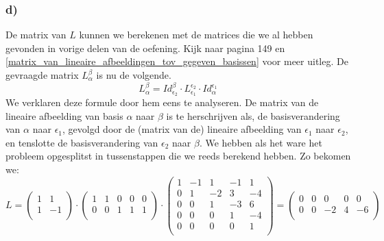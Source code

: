 \documentclass[lineaire_algebra_oplossingen.tex]{subfiles}
\begin{document}
\subsubsection*{d)}
De matrix van $L$ kunnen we berekenen met de matrices die we al hebben gevonden in vorige delen van de oefening. Kijk naar pagina 149 en \ref{matrix_van_lineaire_afbeeldingen_tov_gegeven_basissen} voor meer uitleg.
De gevraagde matrix $L_\alpha^\beta$ is nu de volgende.
\[
L_\alpha^\beta = Id_{\epsilon_2}^\beta\cdot L_{\epsilon_1}^{\epsilon_2}\cdot Id_{\alpha}^{\epsilon_1}
\]
We verklaren deze formule door hem eens te analyseren. De matrix van de lineaire afbeelding van basis $\alpha$ naar $\beta$ is te herschrijven als, de basisverandering van $\alpha$ naar $\epsilon_1$, gevolgd door de (matrix van de) lineaire afbeelding van $\epsilon_1$ naar $\epsilon_2$, en tenslotte de basisverandering van $\epsilon_2$ naar $\beta$. We hebben als het ware het probleem opgesplitst in tussenstappen die we reeds berekend hebben. Zo bekomen we: 
\[
L = 
\begin{pmatrix}
1 & 1\\ 
1 & -1\\
\end{pmatrix}
\cdot
\begin{pmatrix}
1 & 1 & 0 & 0 & 0\\
0 & 0 & 1 & 1 & 1\\
\end{pmatrix}
\cdot
\begin{pmatrix}
1 & -1 & 1 & -1 & 1 \\ 
0 & 1 & -2 & 3 & -4\\ 
0 & 0 & 1 & -3 & 6\\ 
0 & 0 & 0 & 1 & -4\\ 
0 & 0 & 0 & 0 & 1\\ 
\end{pmatrix}
=
\begin{pmatrix}
0 & 0 & 0 & 0 & 0\\
0 & 0 & -2 & 4 & -6\\
\end{pmatrix}
\]
\end{document}
